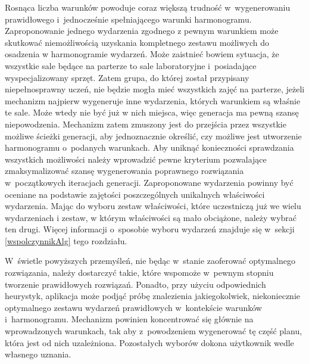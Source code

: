 \documentclass[a4paper]{book}
\begin{document}
Rosnąca liczba warunków powoduje coraz większą trudność w~wygenerowaniu prawidłowego i~jednocześnie spełniającego warunki harmonogramu. Zaproponowanie jednego wydarzenia zgodnego z pewnym warunkiem może skutkować niemożliwością uzyskania kompletnego zestawu możliwych do osadzenia w harmonogramie wydarzeń. Może zaistnieć bowiem sytuacja, że wszystkie sale będące na parterze to sale laboratoryjne i~posiadające wyspecjalizowany sprzęt. Zatem grupa, do której został przypisany niepełnosprawny uczeń, nie będzie mogła mieć wszystkich zajęć na parterze, jeżeli mechanizm najpierw wygeneruje inne wydarzenia, których warunkiem są właśnie te sale. Może wtedy nie być już w nich miejsca, więc generacja ma pewną szansę niepowodzenia. Mechanizm zatem zmuszony jest do przejścia przez wszystkie możliwe ścieżki generacji, aby jednoznacznie określić, czy możliwe jest utworzenie harmonogramu o~podanych warunkach. Aby uniknąć konieczności sprawdzania wszystkich możliwości należy wprowadzić pewne kryterium pozwalające zmaksymalizować szansę wygenerowania poprawnego rozwiązania w~początkowych iteracjach generacji. Zaproponowane wydarzenia powinny być oceniane na podstawie zajętości poszczególnych unikalnych właściwości wydarzenia. Mając do wyboru zestaw właściwości, które uczestniczą już we wielu wydarzeniach i zestaw, w którym właściwości są mało obciążone, należy wybrać ten drugi. Więcej informacji o~sposobie wyboru wydarzeń znajduje się w~sekcji \ref{wspolczynnikAlg} tego rozdziału.

W~świetle powyższych przemyśleń, nie będąc w~stanie zaoferować optymalnego rozwiązania, należy dostarczyć takie, które wspomoże w~pewnym stopniu tworzenie prawidłowych rozwiązań. Ponadto, przy użyciu odpowiednich heurystyk, aplikacja może podjąć próbę znalezienia jakiegokolwiek, niekoniecznie optymalnego zestawu wydarzeń prawidłowych w~kontekście warunków i~harmonogramu. Mechanizm powinien koncentrować się głównie na wprowadzonych warunkach, tak aby z~powodzeniem wygenerować tę część planu, która jest od nich uzależniona. Pozostałych wyborów dokona użytkownik wedle własnego uznania.
\end{document}
